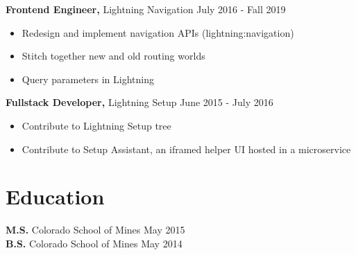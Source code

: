 \documentclass[12pt]{res}
\begin{document}
\begin{resume}
{\bf Frontend Engineer,} Lightning Navigation \hfill July 2016 - Fall 2019
\begin{itemize} \itemsep -2pt
    \item Redesign and implement navigation APIs (lightning:navigation)
    \item Stitch together new and old routing worlds
    \item Query parameters in Lightning
\end{itemize}

{\bf Fullstack Developer,} Lightning Setup \hfill June 2015 - July 2016
\begin{itemize} \itemsep -2pt
    \item Contribute to Lightning Setup tree
    \item Contribute to Setup Assistant, an iframed helper UI hosted in a microservice
\end{itemize}

\section{Education}

{\bf M.S.} Colorado School of Mines \hfill May 2015 \\
{\bf B.S.} Colorado School of Mines \hfill May 2014





\end{resume}
\end{document}
